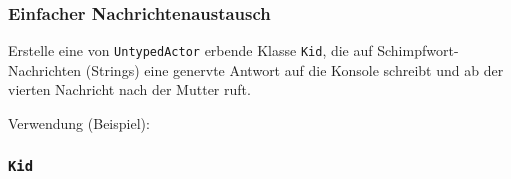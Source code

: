 \documentclass{beamer}
\date{2017-02-06/07}
\begin{document}
\normalsize
\normalem

\lstset{language=Java}

\begin{frame}[plain]
  \titlepage
\end{frame}

\begin{frame}
  \frametitle{Einfacher Nachrichtenaustausch}
  Erstelle eine von \lstinline{UntypedActor} erbende Klasse \lstinline{Kid},
  die auf Schimpfwort-Nachrichten (Strings) eine genervte Antwort auf die Konsole schreibt
  und ab der vierten Nachricht nach der Mutter ruft.
  
  Verwendung (Beispiel):
  
\end{frame}

\begin{frame}
  \frametitle{\lstinline{Kid}}
  
\end{frame}
\end{document}
